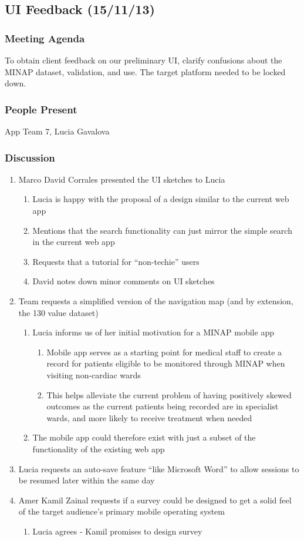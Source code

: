 \documentclass[12pt,a4paper,oneside,titlepage]{article}
\begin{document}
\subsection{UI Feedback (15/11/13)}
\subsubsection{Meeting Agenda}
To obtain client feedback on our preliminary UI, clarify confusions about the MINAP dataset, validation, and use. The target platform needed to be locked down.
\subsubsection{People Present}
App Team 7, Lucia Gavalova
\subsubsection{Discussion}
\begin{enumerate}
	\item Marco David Corrales presented the UI sketches to Lucia 
	\begin{enumerate}
	\item Lucia is happy with the proposal of a design similar to the current web app
	\item Mentions that the search functionality can just mirror the simple search in the current web app
	\item Requests that a tutorial for “non-techie” users 
	\item David notes down minor comments on UI sketches 
	\end{enumerate}
	\item Team requests a simplified version of the navigation map (and by extension, the 130 value dataset)
	\begin{enumerate}
	\item Lucia informs us of her initial motivation for a MINAP mobile app 
	\begin{enumerate}
		\item Mobile app serves as a starting point for medical staff to create a record for patients eligible to be monitored through MINAP when visiting non-cardiac wards 
		\item This helps alleviate the current problem of having positively skewed outcomes as the current patients being recorded are in specialist wards, and more likely to receive treatment when needed 
	\end{enumerate}
	\item The mobile app could therefore exist with just a subset of the functionality of the existing web app 
	\end{enumerate}
	\item Lucia requests an auto-save feature “like Microsoft Word” to allow sessions to be resumed later within the same day 
	\item Amer Kamil Zainal requests if a survey could be designed to get a solid feel of the target audience’s primary mobile operating system 
	\begin{enumerate}
	\item Lucia agrees - Kamil promises to design survey
	\end{enumerate}
\end{enumerate}
\end{document}
